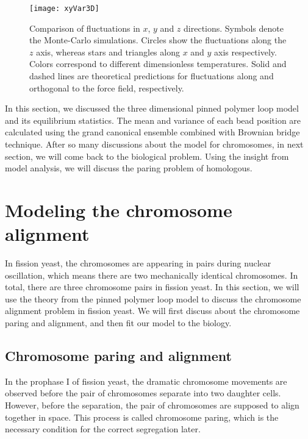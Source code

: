 \begin{figure}[htpb]
    \centering
    \texttt{[image: xyVar3D]}
    \caption{Comparison of fluctuations in $x$, $y$ and $z$ directions. Symbols denote the Monte-Carlo simulations. Circles show the fluctuations along the $z$ axis, whereas stars and triangles along $x$ and $y$ axis respectively. Colors correspond to different dimensionless temperatures. Solid and dashed lines are theoretical predictions for fluctuations along and orthogonal to the force field, respectively.}
    \label{fig:xyVar3D}
\end{figure}

In this section, we discussed the three dimensional pinned polymer loop model and its equilibrium statistics. The mean and variance of each bead position are calculated using the grand canonical ensemble combined with Brownian bridge technique. After so many discussions about the model for chromosomes, in next section, we will come back to the biological problem. Using the insight from model analysis, we will discuss the paring problem of homologous. 


\section{Modeling the chromosome alignment}
\label{sec:modeling_the_chromosome_alignment}
In fission yeast, the chromosomes are appearing in pairs during nuclear oscillation, which means there are two mechanically identical chromosomes. In total, there are three chromosome pairs in fission yeast. In this section, we will use the theory from the pinned polymer loop model to discuss the chromosome alignment problem in fission yeast. We will first discuss about the chromosome paring and alignment, and then fit our model to the biology.

\subsection{Chromosome paring and alignment}
\label{sub:chromosome_paring_and_alignment}

In the prophase I of fission yeast, the dramatic chromosome movements are observed before the pair of chromosomes separate into two daughter cells. However, before the separation, the pair of chromosomes are supposed to align together in space. This process is called chromosome paring, which is the necessary condition for the correct segregation later.


